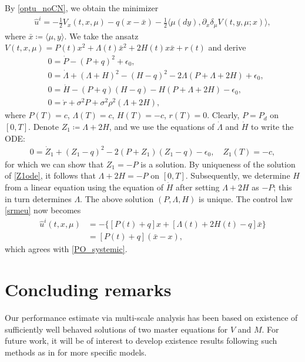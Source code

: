 \documentclass{amsart}
\theoremstyle{definition}
\theoremstyle{remark}
\numberwithin{equation}{section}
\begin{document}
By   \eqref{optu_noCN}, we obtain the minimizer
\begin{align}
\hat u^i= -\frac12V_x (t,x,\mu)-q(x-\bar x) -\frac12
\langle \mu(dy) , \partial_x \delta_\mu V(t,y,\mu; x)   \rangle , \label{srmeu}
\end{align}
where $\bar x\coloneqq \langle \mu, y \rangle$.
We take the ansatz $V(t, x, \mu)=P(t) x^2 +\Lambda(t) \bar x^2+2H(t) x\bar x+r(t)$ and  derive
\begin{align*}
& 0= \dot P -(P+q)^2+\epsilon_0 ,  \\
& 0= \dot \Lambda +(\Lambda +H)^2-(H-q)^2  -2\Lambda (P+\Lambda +2H)+\epsilon_0 , \\
& 0= \dot H -(P+q)(H-q)-H(P+\Lambda +2H) -\epsilon_0   ,\\
&0 =\dot r  +\sigma^2 P+ \sigma^2 \rho^2 (\Lambda +2H ),
\end{align*}
where $P(T)=c$, $\Lambda (T)=c$, $H(T)= -c$, $r(T)=0$.
Clearly, $P=P_d$ on $[0,T]$.
Denote $Z_1\coloneqq \Lambda +2H$, and we use the equations of $\dot \Lambda$ and $\dot H$ to write the ODE:
\begin{align}\label{Z1ode}
0=\dot Z_1 +(Z_1-q)^2-2(P+Z_1)(Z_1-q) -\epsilon_0, \quad Z_1(T)= -c,
\end{align}
 for which we can show that $Z_1=-P$ is a solution. By uniqueness of the solution of \eqref{Z1ode}, it follows that $\Lambda + 2H=-P$ on $[0,T]$. Subsequently, we determine $H$ from a linear equation using the equation of $\dot H$ after setting $\Lambda +2H$ as $-P$; this in turn determines  $\Lambda$.
 The above solution $(P, \Lambda, H)$ is unique.
The  control law \eqref{srmeu} now becomes
\begin{align*}
\hat u^i(t,x,\mu)&= -\{[P(t)+q]x+[\Lambda(t) +2H(t)-q] \bar x\}\\
&= [P(t)+q](\bar x-x),
\end{align*}
which agrees with \eqref{PO_systemic}.



\section{Concluding remarks}

Our performance estimate via multi-scale analysis has been based on existence of sufficiently well behaved solutions of two master equations for $V$ and $M$. For future work, it will be of interest to develop  existence results following such methods as in \cite{CDLL19,CCD22} for more specific models.
\end{document}
